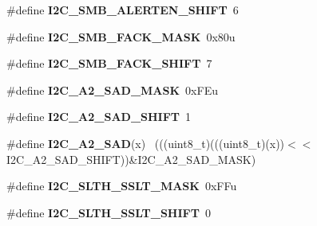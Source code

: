 \begin{DoxyCompactItemize}
\item 
\hypertarget{group___i2_c___register___masks_gab3807b572e12675922212a4ccfaf9327}{}\#define {\bfseries I2\+C\+\_\+\+S\+M\+B\+\_\+\+A\+L\+E\+R\+T\+E\+N\+\_\+\+S\+H\+I\+F\+T}~6\label{group___i2_c___register___masks_gab3807b572e12675922212a4ccfaf9327}

\item 
\hypertarget{group___i2_c___register___masks_ga6c32b35c6a034b2d36c8341e41e1f5e0}{}\#define {\bfseries I2\+C\+\_\+\+S\+M\+B\+\_\+\+F\+A\+C\+K\+\_\+\+M\+A\+S\+K}~0x80u\label{group___i2_c___register___masks_ga6c32b35c6a034b2d36c8341e41e1f5e0}

\item 
\hypertarget{group___i2_c___register___masks_ga8818be9583854e197aa6f7197d42e825}{}\#define {\bfseries I2\+C\+\_\+\+S\+M\+B\+\_\+\+F\+A\+C\+K\+\_\+\+S\+H\+I\+F\+T}~7\label{group___i2_c___register___masks_ga8818be9583854e197aa6f7197d42e825}

\item 
\hypertarget{group___i2_c___register___masks_ga953881ff63411be620fa173f27ab4efa}{}\#define {\bfseries I2\+C\+\_\+\+A2\+\_\+\+S\+A\+D\+\_\+\+M\+A\+S\+K}~0x\+F\+Eu\label{group___i2_c___register___masks_ga953881ff63411be620fa173f27ab4efa}

\item 
\hypertarget{group___i2_c___register___masks_gad1c31a37087b37cb76faeade10a4fbd6}{}\#define {\bfseries I2\+C\+\_\+\+A2\+\_\+\+S\+A\+D\+\_\+\+S\+H\+I\+F\+T}~1\label{group___i2_c___register___masks_gad1c31a37087b37cb76faeade10a4fbd6}

\item 
\hypertarget{group___i2_c___register___masks_gad2d2b455e73424296d197bfae13a2c3b}{}\#define {\bfseries I2\+C\+\_\+\+A2\+\_\+\+S\+A\+D}(x)                                                    ~(((uint8\+\_\+t)(((uint8\+\_\+t)(x))$<$$<$I2\+C\+\_\+\+A2\+\_\+\+S\+A\+D\+\_\+\+S\+H\+I\+F\+T))\&I2\+C\+\_\+\+A2\+\_\+\+S\+A\+D\+\_\+\+M\+A\+S\+K)\label{group___i2_c___register___masks_gad2d2b455e73424296d197bfae13a2c3b}

\item 
\hypertarget{group___i2_c___register___masks_gaeef081c4825bc9248b218f4c6ee70f86}{}\#define {\bfseries I2\+C\+\_\+\+S\+L\+T\+H\+\_\+\+S\+S\+L\+T\+\_\+\+M\+A\+S\+K}~0x\+F\+Fu\label{group___i2_c___register___masks_gaeef081c4825bc9248b218f4c6ee70f86}

\item 
\hypertarget{group___i2_c___register___masks_gadc7429d429b6c58a18bcf147884e618f}{}\#define {\bfseries I2\+C\+\_\+\+S\+L\+T\+H\+\_\+\+S\+S\+L\+T\+\_\+\+S\+H\+I\+F\+T}~0\label{group___i2_c___register___masks_gadc7429d429b6c58a18bcf147884e618f}


\end{DoxyCompactItemize}
